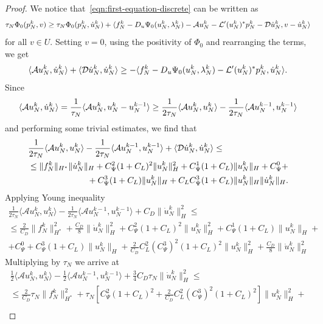 \documentclass[a4paper,10pt,twoside]{amsbook}
\numberwithin{section}{chapter}
\numberwithin{equation}{chapter}
\theoremstyle{definition}
\DeclarePairedDelimiter{\norm}{\lVert}{\rVert}
\DeclarePairedDelimiter{\dual}{\langle}{\rangle}
\begin{document}
\begin{proof}
We notice that~\eqref{eqn:first-equation-discrete} can be written as
\begin{equation}
\label{eqn:inclusion-explicit}
\tau_N\Phi_0(p_N^k,v)\ge\tau_N\Phi_0(p_N^k,\dot u_N^k)+\dual{f_N^k-D_u\Psi_0(u_N^k,\lambda_N^k)-\mathcal{A}u_N^k-\mathcal{L}'(u_N^k)^*p_N^k-\mathcal{D}\dot u_N^k,v-\dot u_N^k}
\end{equation}
for all $v\in U$. Setting $v=0$, using the positivity of $\Phi_0$ and rearranging the terms, we get
\[
\dual{\mathcal{A}u_N^k,\dot u_N^k}+\dual{\mathcal{D}\dot u_N^k,\dot u_N^k}\ge-\dual{f_N^k-D_u\Psi_0(u_N^k,\lambda_N^k)-\mathcal{L}'(u_N^k)^*p_N^k,\dot u_N^k}.
\]
Since
\[
\dual{\mathcal{A}u_N^k,\dot u_N^k}=\frac{1}{\tau_N}\dual{\mathcal{A}u_N^k,u_N^k-u_N^{k-1}}\ge\frac{1}{2\tau_N}\dual{\mathcal{A}u_N^k,u_N^k}-\frac{1}{2\tau_N}\dual{\mathcal{A}u_N^{k-1},u_N^{k-1}}
\]
and performing some trivial estimates, we find that
\[
\begin{multlined}
\frac{1}{2\tau_N}\langle \mathcal Au_N^k,u_N^k\rangle-\frac{1}{2\tau_N}\langle \mathcal Au_N^{k-1},u_N^{k-1}\rangle+\langle \mathcal D\dot{u}_N^k,\dot{u}_N^k\rangle\le\\
\le\|f_N^k\|_{H^*}\|\dot{u}_N^k\|_H+C_\Psi^2(1+C_L)^2\norm{u_N^k}_H^2+C_\Psi^1(1+C_L)\norm{u_N^k}_H+C_\Psi^0+\\
+C_\Psi^3(1+C_L)\norm{u_N^k}_H+C_LC_\Psi^3(1+C_L)\|u_N^k\|_H\|\dot{u}_N^k\|_H.
\end{multlined}
\]
Applying Young inequality
\[
\begin{multlined}
\frac{1}{2\tau_N}\langle \mathcal{A}u_N^k,u_N^k\rangle-\frac{1}{2\tau_N}\langle \mathcal{A}u_N^{k-1},u_N^{k-1}\rangle+C_D\|\dot{u}_N^k\|_H^2\le\\
\le\frac{2}{C_D}\|f_N^k\|_{H^*}^2+\frac{C_D}{8}\|\dot{u}_N^k\|_H^2+C_\Psi^2(1+C_L)^2\|u_N^k\|_H^2+C_\Psi^1(1+C_L)\|u_N^k\|_H+\\
+C_\Psi^0+C_\Psi^3(1+C_L)\|u_N^k\|_H+\frac{2}{C_D}C_L^2(C_\Psi^3)^2(1+C_L)^2\|u_N^k\|_H^2+\frac{C_D}{8}\|\dot{u}_N^k\|_H^2
\end{multlined}
\]
Multiplying by $\tau_N$ we arrive at
\[
\begin{multlined}
\frac{1}{2}\langle \mathcal Au_N^k,u_N^k\rangle-\frac{1}{2}\langle\mathcal Au_N^{k-1},u_N^{k-1}\rangle+\frac{3}{4}C_D\tau_N\|\dot{u}_N^k\|_H^2\le\\
\le\frac{2}{C_D}\tau_N\|f_N^k\|_{H^*}^2+\tau_N\left[C_\Psi^2(1+C_L)^2+\frac{2}{C_D}C_L^2(C_\Psi^3)^2(1+C_L)^2\right]\|u_N^k\|_H^2+\\

\end{multlined}\]
\end{proof}
\end{document}
